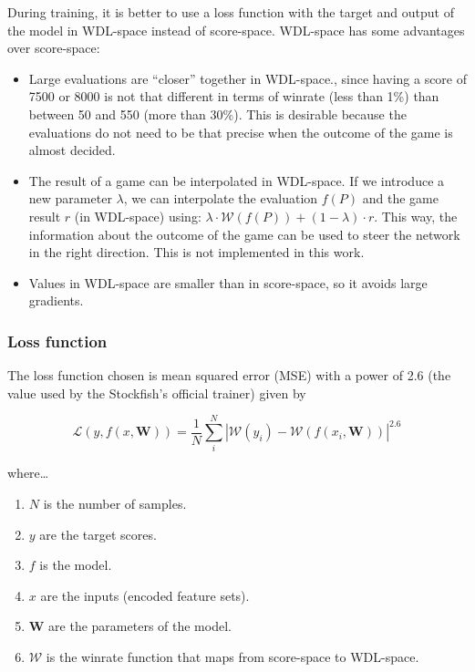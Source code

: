 During training, it is better to use a loss function with the target and output of the model in WDL-space instead of score-space. WDL-space has some advantages over score-space:

\begin{itemize}
\item Large evaluations are \enquote{closer} together in WDL-space., since having a score of 7500 or 8000 is not that different in terms of winrate (less than 1\%) than between 50 and 550 (more than 30\%). This is desirable because the evaluations do not need to be that precise when the outcome of the game is almost decided.
\item The result of a game can be interpolated in WDL-space. If we introduce a new parameter $\lambda$, we can interpolate the evaluation $f(P)$ and the game result $r$ (in WDL-space) using: $\lambda \cdot \mathcal{W}(f(P)) + (1 - \lambda) \cdot r$. This way, the information about the outcome of the game can be used to steer the network in the right direction. This is not implemented in this work.
\item Values in WDL-space are smaller than in score-space, so it avoids large gradients.
\end{itemize}




\subsubsection{Loss function}

The loss function chosen is mean squared error (MSE) with a power of 2.6 (the value used by the Stockfish's official trainer) given by


\[
\mathcal{L}(y,f(x,\bm{W}))= \frac{1}{N} \sum_i^N \left| \mathcal{W}(y_i) - \mathcal{W}(f(x_i,\bm{W})) \right| ^{2.6}
\]

where\dots

\begin{enumerate}
\itemsep0em
\item $N$ is the number of samples.
\item $y$ are the target scores.
\item $f$ is the model.
\item $x$ are the inputs (encoded feature sets).
\item $\bm{W}$ are the parameters of the model.
\item $\mathcal{W}$ is the winrate function that maps from score-space to WDL-space.
\end{enumerate}

